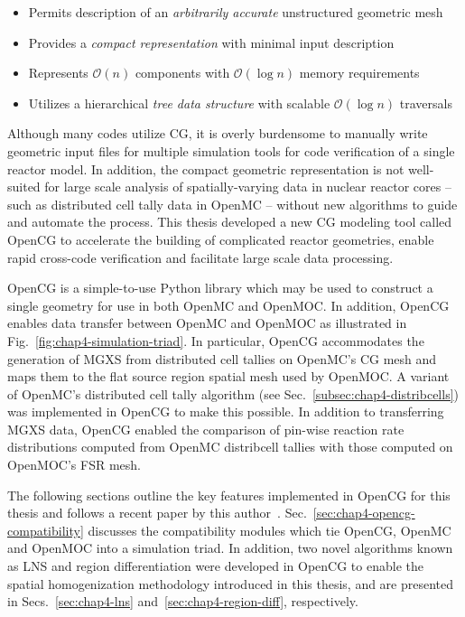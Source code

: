 \begin{itemize}[noitemsep]
  \item Permits description of an \textit{arbitrarily accurate} unstructured geometric mesh
  \item Provides a \textit{compact representation} with minimal input description
  \item Represents $\mathcal{O}(n)$ components with $\mathcal{O}(\log{}n)$ memory requirements
  \item Utilizes a hierarchical \textit{tree data structure} with scalable $\mathcal{O}(\log{}n)$ traversals
\end{itemize}

\noindent Although many codes utilize \ac{CG}, it is overly burdensome to manually write geometric input files for multiple simulation tools for code verification of a single reactor model. In addition, the compact geometric representation is not well-suited for large scale analysis of spatially-varying data in nuclear reactor cores -- such as distributed cell tally data in OpenMC -- without new algorithms to guide and automate the process. This thesis developed a new \ac{CG} modeling tool called OpenCG to accelerate the building of complicated reactor geometries, enable rapid cross-code verification and facilitate large scale data processing. 

OpenCG is a simple-to-use Python library which may be used to construct a single geometry for use in both OpenMC and OpenMOC. In addition, OpenCG enables data transfer between OpenMC and OpenMOC as illustrated in Fig.~\ref{fig:chap4-simulation-triad}. In particular, OpenCG accommodates the generation of \ac{MGXS} from distributed cell tallies on OpenMC's \ac{CG} mesh and maps them to the flat source region spatial mesh used by OpenMOC. A variant of OpenMC's distributed cell tally algorithm (see Sec.~\ref{subsec:chap4-distribcells}) was implemented in OpenCG to make this possible. In addition to transferring \ac{MGXS} data, OpenCG enabled the comparison of pin-wise reaction rate distributions computed from OpenMC distribcell tallies with those computed on OpenMOC's \ac{FSR} mesh.

The following sections outline the key features implemented in OpenCG for this thesis and follows a recent paper by this author~\cite{boyd2015opencg}. Sec.~\ref{sec:chap4-opencg-compatibility} discusses the compatibility modules which tie OpenCG, OpenMC and OpenMOC into a simulation triad. In addition, two novel algorithms known as \ac{LNS} and region differentiation were developed in OpenCG to enable the spatial homogenization methodology introduced in this thesis, and are presented in Secs.~\ref{sec:chap4-lns} and~\ref{sec:chap4-region-diff}, respectively.

